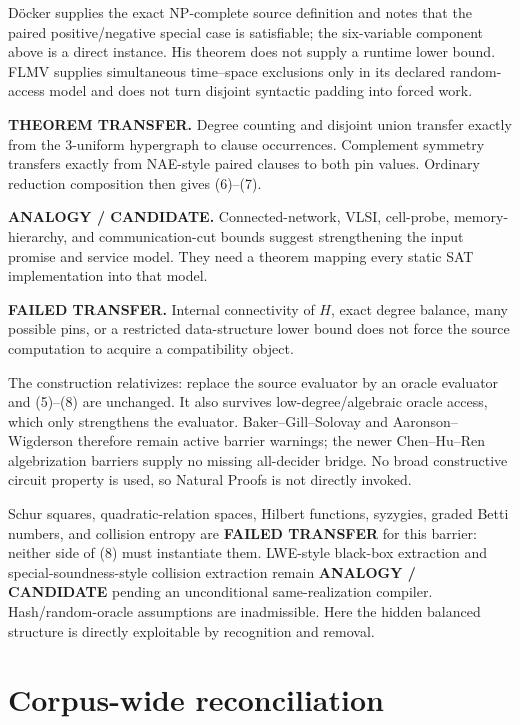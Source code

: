 \documentclass[11pt]{article}
\begin{document}
D\"ocker supplies the exact NP-complete source definition and notes that the
paired positive/negative special case is satisfiable; the six-variable
component above is a direct instance.  His theorem does not supply a runtime
lower bound.  FLMV supplies simultaneous time--space exclusions only in its
declared random-access model and does not turn disjoint syntactic padding
into forced work.

\begin{description}[leftmargin=0cm,labelwidth=0cm]
\item[] \textbf{THEOREM TRANSFER.}
Degree counting and disjoint union transfer exactly from the 3-uniform
hypergraph to clause occurrences.  Complement symmetry transfers exactly
from NAE-style paired clauses to both pin values.  Ordinary reduction
composition then gives (6)--(7).
\item[] \textbf{ANALOGY / CANDIDATE.}
Connected-network, VLSI, cell-probe, memory-hierarchy, and communication-cut
bounds suggest strengthening the input promise and service model.  They need
a theorem mapping every static SAT implementation into that model.
\item[] \textbf{FAILED TRANSFER.}
Internal connectivity of $H$, exact degree balance, many possible pins, or a
restricted data-structure lower bound does not force the source computation
to acquire a compatibility object.
\end{description}

The construction relativizes: replace the source evaluator by an oracle
evaluator and (5)--(8) are unchanged.  It also survives low-degree/algebraic
oracle access, which only strengthens the evaluator.  Baker--Gill--Solovay
and Aaronson--Wigderson therefore remain active barrier warnings; the newer
Chen--Hu--Ren algebrization barriers supply no missing all-decider bridge.
No broad constructive circuit property is used, so Natural Proofs is not
directly invoked.

Schur squares, quadratic-relation spaces, Hilbert functions, syzygies,
graded Betti numbers, and collision entropy are \textbf{FAILED TRANSFER} for
this barrier: neither side of (8) must instantiate them.  LWE-style
black-box extraction and special-soundness-style collision extraction remain
\textbf{ANALOGY / CANDIDATE} pending an unconditional same-realization
compiler.  Hash/random-oracle assumptions are inadmissible.  Here the hidden
balanced structure is directly exploitable by recognition and removal.

\section{Corpus-wide reconciliation}
\end{document}
